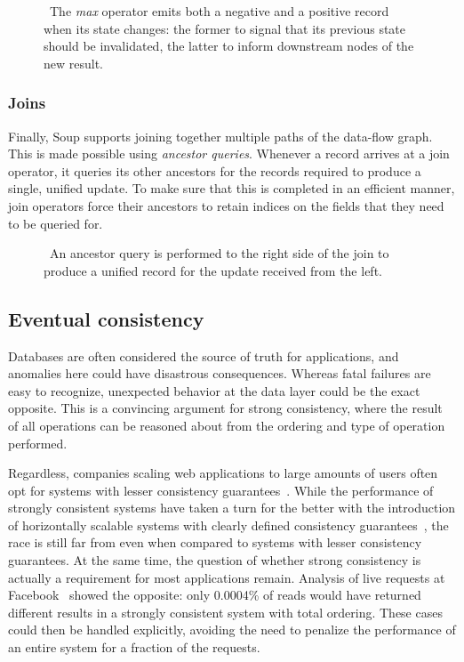 \begin{figure}[H]
  \centering
  
  \caption{\
    The \textit{max} operator emits both a negative and a positive record when
    its state changes: the former to signal that its previous state should be
    invalidated, the latter to inform downstream nodes of the new result.
  }
\end{figure}

\subsubsection{Joins}

Finally, Soup supports joining together multiple paths of the data-flow graph.
This is made possible using \textit{ancestor queries}. Whenever a record arrives
at a join operator, it queries its other ancestors for the records required to
produce a single, unified update. To make sure that this is completed in an
efficient manner, join operators force their ancestors to retain indices on the
fields that they need to be queried for.

\begin{figure}[H]
  \centering
  
  \caption{\
    An ancestor query is performed to the right side of the join to produce a
    unified record for the update received from the left.
  }
\end{figure}

\subsection{Eventual consistency}

Databases are often considered the source of truth for applications, and
anomalies here could have disastrous consequences. Whereas fatal failures are
easy to recognize, unexpected behavior at the data layer could be the exact
opposite. This is a convincing argument for strong consistency, where the result
of all operations can be reasoned about from the ordering and type of operation
performed.

Regardless, companies scaling web applications to large amounts of users often
opt for systems with lesser consistency guarantees~\cite{dynamo, pnuts, werner}.
While the performance of strongly consistent systems have taken a turn for the
better with the introduction of horizontally scalable systems with clearly defined
consistency guarantees~\cite{spanner, cockroach}, the race is still far from
even when compared to systems with lesser consistency guarantees. At the same
time, the question of whether strong consistency is actually a requirement for
most applications remain. Analysis of live requests at
Facebook~\cite{existential} showed the opposite: only 0.0004\% of reads would
have returned different results in a strongly consistent system with total
ordering. These cases could then be handled explicitly, avoiding the need to
penalize the performance of an entire system for a fraction of the requests.

